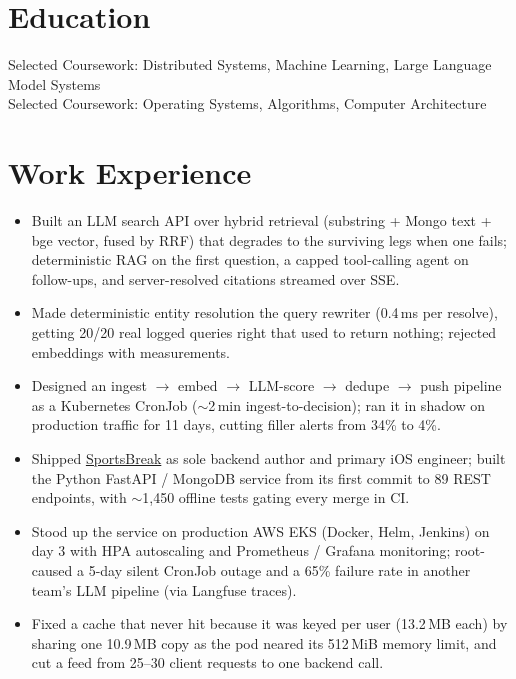\documentclass[11pt, letterpaper]{article}
\begin{document}

\section{Education}
Selected Coursework: Distributed Systems, Machine Learning, Large Language Model Systems\\[1pt]
Selected Coursework: Operating Systems, Algorithms, Computer Architecture

\section{Work Experience}
\begin{itemize}
  \item Built an LLM search API over hybrid retrieval (substring + Mongo text + bge vector, fused by RRF) that degrades to the surviving legs when one fails; deterministic RAG on the first question, a capped tool-calling agent on follow-ups, and server-resolved citations streamed over SSE.
  \item Made deterministic entity resolution the query rewriter (0.4\,ms per resolve), getting 20/20 real logged queries right that used to return nothing; rejected embeddings with measurements.
  \item Designed an ingest $\to$ embed $\to$ LLM-score $\to$ dedupe $\to$ push pipeline as a Kubernetes CronJob ($\sim$2\,min ingest-to-decision); ran it in shadow on production traffic for 11 days, cutting filler alerts from 34\% to 4\%.
  \item Shipped \href{https://apps.apple.com/app/id6762649287}{SportsBreak} as sole backend author and primary iOS engineer; built the Python FastAPI / MongoDB service from its first commit to 89 REST endpoints, with $\sim$1{,}450 offline tests gating every merge in CI.
  \item Stood up the service on production AWS EKS (Docker, Helm, Jenkins) on day 3 with HPA autoscaling and Prometheus / Grafana monitoring; root-caused a 5-day silent CronJob outage and a 65\% failure rate in another team's LLM pipeline (via Langfuse traces).
  \item Fixed a cache that never hit because it was keyed per user (13.2\,MB each) by sharing one 10.9\,MB copy as the pod neared its 512\,MiB memory limit, and cut a feed from 25--30 client requests to one backend call.
\end{itemize}
\end{document}
